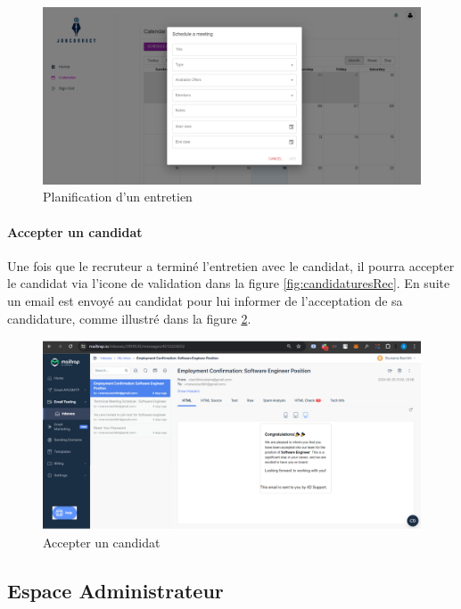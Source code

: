 \begin{figure}[htbp]
   \centering
   \includegraphics[scale=0.18]{screens/schedule.png} 
   \caption{Planification d'un entretien}
   \label{fig:scheduleIcon}
\end{figure}

\paragraph*{Accepter un candidat}
Une fois que le recruteur a terminé l'entretien avec le candidat,
il pourra accepter le candidat via l'icone de validation dans la figure \ref{fig:candidaturesRec}.
En suite un email est envoyé au candidat pour lui informer de 
l'acceptation de sa candidature, comme illustré dans la figure \ref{fig:mailAccept}.
\begin{figure}[htbp]
   \centering
   \includegraphics[scale=0.2]{screens/acceptCandidate.png}
   \caption{Accepter un candidat}
   \label{fig:mailAccept}
   \end{figure}




\subsection{Espace Administrateur}

